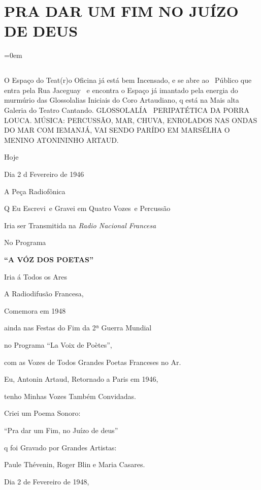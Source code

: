 \pagestyle{fancy}
\part{PRA DAR UM FIM NO JUÍZO DE DEUS}
\parindent=0em

\chapter*{}

\mbox{}\vfill
\begin{flushleft}
O Espaço do Teat(r)o Oficina já está bem Incensado, e se abre ao~
Público que entra pela Rua Jaceguay~ e encontra o Espaço já imantado
pela energia do murmúrio das Glossolalias Iniciais do Coro Artaudiano, q
está na Mais alta Galeria do Teatro Cantando. GLOSSOLALÍA ~PERIPATÉTICA
DA PORRA LOUCA. MÚSICA: PERCUSSÃO, MAR, CHUVA, ENROLADOS NAS ONDAS DO
MAR COM IEMANJÁ, VAI SENDO PARÍDO EM MARSÉLHA O MENINO ATONININHO
ARTAUD.
\end{flushleft}



Hoje

Dia 2 d Fevereiro de 1946

A Peça Radiofônica~

Q Eu Escrevi~e Gravei em Quatro Vozes~e Percussão

Iria ser Transmitida na \emph{Radio Nacional Francesa} ~

No Programa

\textbf{``A VÓZ DOS POETAS''}

Iria á Todos os Ares~

A Radiodifusão Francesa,~

Comemora em 1948

ainda nas Festas do Fim da 2ª Guerra Mundial

no Programa ``La Voix de Poètes'',

com as Vozes de Todos Grandes Poetas Franceses no Ar.~

Eu, Antonin Artaud, Retornado a Paris em 1946,

tenho Minhas Vozes Também Convidadas.~

Criei um Poema Sonoro:

``Pra dar um Fim, no Juízo de deus''

q foi Gravado por Grandes Artistas:

Paule Thévenin, Roger Blin e Maria Casares.

Dia 2 de Fevereiro de 1948,

